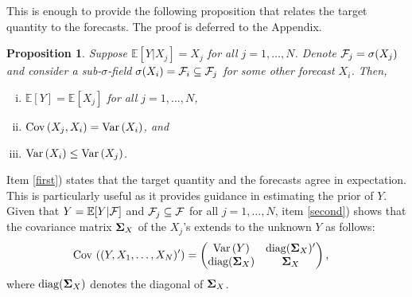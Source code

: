 \documentclass[11pt]{article}
\renewcommand{\P}{\mathbb{P}}
\newcommand{\E}{\mathbb{E}}
\newtheorem{proposition}[theorem]{Proposition}
\theoremstyle{definition}
\theoremstyle{definition}
\def\bSigma{{\bf \Sigma}}
\def\F{{\cal F}}
\def\P{{\mathbb P}}
\def\E{{\mathbb E}}
\def\Var{{\rm Var}\,}
\def\Cov{{\rm Cov}\,}
\def\diag{\text{diag}}
\def\diag{\text{diag}}
\begin{document}
 
 This is enough to provide the following proposition that relates the target quantity to the forecasts. The proof is deferred to the Appendix.
 \begin{proposition}
\label{covstr}
Suppose $\E[Y|X_j]  = X_j$ for all $j =1, \dots, N$. Denote $\F_j = \sigma(X_j)$ and consider a sub-$\sigma$-field $\sigma(X_i) = \F_i \subseteq \F_j$ for some other forecast $X_i$. Then,
\begin{enumerate}[i)] 
\item $\E[Y] = \E[X_j]$ for all $j = 1, \dots, N$, \label{first}
\item $\Cov(X_j, X_i) = \Var(X_i)$, and  \label{second}
\item $\Var(X_i) \leq \Var(X_j)$.  \label{third}
\end{enumerate}
\end{proposition}
\noindent
Item \ref{first}) states that the target quantity and the forecasts agree in expectation. This is particularly useful as it provides guidance in estimating the prior of $Y$. 
%
Given that $Y = \E[Y | \F]$ and $\F_j \subseteq \F$ for all $j = 1, \dots, N$, item \ref{second}) shows that the covariance matrix $\bSigma_X$ of the $X_j$'s extends to the unknown $Y$ as follows:
\begin{align}
\Cov\left((Y, X_1, \dots, X_N)'\right) &=  \left( \begin{matrix} 
 \Var(Y)  & \diag(\bSigma_X)'  \\
\diag(\bSigma_X) & \bSigma_X \\
\end{matrix} \right), \label{cov_str}
\end{align}
where $\diag(\bSigma_X)$ denotes the diagonal of $\bSigma_X$.
%
\end{document}

